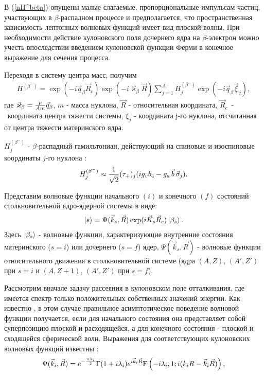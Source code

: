 \documentclass[14pt, a4paper]{article}
\numberwithin{figure}{section}
\numberwithin{equation}{section}
\begin{document}
В (\ref{nH^beta}) опущены малые слагаемые, пропорциональные импульсам частиц,
участвующих в $\beta$-распадном процессе и предполагается, что пространственная
зависимость лептонных волновых функций имеет вид плоской волны.
При необходимости действие
кулоновского поля дочернего ядра на $\beta$-электрон можно учесть
впоследствии введением кулоновской функции
Ферми в конечное выражение для сечения процесса.

Переходя в систему центра масс, получим
\begin{eqnarray}\label{H^beta}
H^{(\beta^-)}=\exp{(-i\vec q_\beta\vec R_c)}\exp{( -i \vec \varkappa_\beta \vec R)}
\sum_{j=1}^A H^{(\beta^-)}_{j}\exp{(-i\vec q_\beta\vec\xi_{j})},
\end{eqnarray}
где  $\vec \varkappa_\beta=
{\mu\over Am}\vec q_\beta$, $m$ - масса нуклона,
$\vec R$ - относительная координата, $\vec R_c$~-~координата
центра тяжести системы,
$\xi_j$  - координата j-го нуклона, отсчитанная от центра тяжести материнского
ядра.

$H^{(\beta^-)}_{j}$ - $\beta$-распадный гамильтониан, действующий
на спиновые и изоспиновые координаты $j$-го нуклона \cite{aiz}:
\begin{eqnarray}
H^{(\beta^-)}_{j}\approx {1\over{\sqrt 2}}(\tau_+)_j ( i g_v b_4 - g_a\, \vec b\, \vec \sigma_j ).\nonumber
\end{eqnarray}


Представим волновые функции начального $(i)$ и конечного $(f)$ состояний
столкновительной ядро-ядерной системы в виде:
\begin{eqnarray}
\ket{s}= \Psi(\vec k_s, \vec R)\exp(i \vec K_s \vec R_c) \ket{ \beta_s}.
\end{eqnarray}
Здесь
$\ket{ \beta_s}$ - волновые функции, характеризующие внутренние состояния
материнского ($s=i$) или дочернего ($s=f$) ядер,
$\Psi (\vec k_s, \vec R)$ - волновые функции относительного движения в
столкновительной системе (ядра $(A,Z)$, $(A',Z')$ при $s=i$
и $(A,Z+1)$, $(A',Z')$ при $s=f$).

Рассмотрим вначале задачу рассеяния в кулоновском поле отталкивания, где имеется  спектр только положительных собственных
значений энергии. Как известно \cite{landau}, в этом случае правильное асимптотическое поведение волновой функции
получается, если для начального состояния она представляет собой суперпозицию плоской и расходящейся, а для конечного
состояния - плоской и сходящейся сферической волн. Выражения для соответствующих кулоновских волновых функций известны
\cite{landau}:
\begin{eqnarray}\label{psi_i}
\Psi (\vec k_i, \vec R)=e^{-{\pi \lambda_i\over2}} \Gamma(1+i\lambda_i)
e^{i \vec k_i \vec R} {\rm F} \left(- i \lambda_i,1;i(k_i R - \vec k_i \vec R)\right),
\end{eqnarray}
\end{document}
